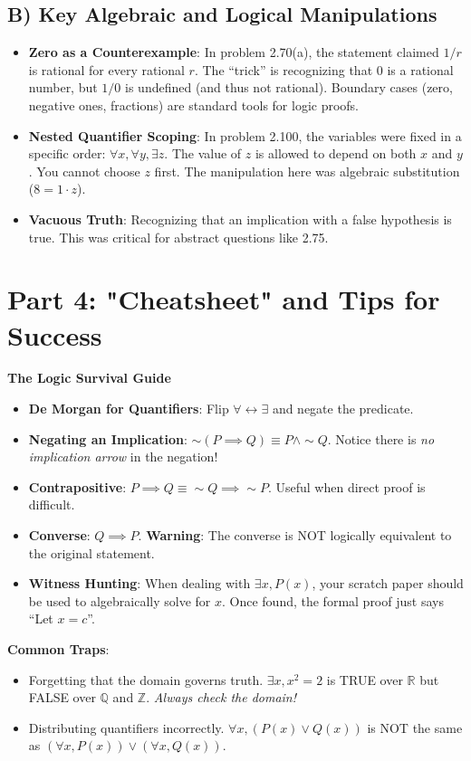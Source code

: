 \documentclass[12pt]{article}
\begin{document}
\subsection{B) Key Algebraic and Logical Manipulations}
\begin{itemize}
    \item \textbf{Zero as a Counterexample}: In problem 2.70(a), the statement claimed $1/r$ is rational for every rational $r$. The ``trick'' is recognizing that $0$ is a rational number, but $1/0$ is undefined (and thus not rational). Boundary cases (zero, negative ones, fractions) are standard tools for logic proofs.
    \item \textbf{Nested Quantifier Scoping}: In problem 2.100, the variables were fixed in a specific order: $\forall x, \forall y, \exists z$. The value of $z$ is allowed to depend on both $x$ and $y$. You cannot choose $z$ first. The manipulation here was algebraic substitution ($8 = 1 \cdot z$).
    \item \textbf{Vacuous Truth}: Recognizing that an implication with a false hypothesis is true. This was critical for abstract questions like 2.75.
\end{itemize}

\section{Part 4: "Cheatsheet" and Tips for Success}

\begin{mdframed}[backgroundcolor=gray!10]
\textbf{The Logic Survival Guide}
\begin{itemize}
    \item \textbf{De Morgan for Quantifiers}: Flip $\forall \leftrightarrow \exists$ and negate the predicate.
    \item \textbf{Negating an Implication}: $\sim(P \implies Q) \equiv P \land \sim Q$. Notice there is \textit{no implication arrow} in the negation!
    \item \textbf{Contrapositive}: $P \implies Q \equiv \sim Q \implies \sim P$. Useful when direct proof is difficult.
    \item \textbf{Converse}: $Q \implies P$. \textbf{Warning}: The converse is NOT logically equivalent to the original statement.
    \item \textbf{Witness Hunting}: When dealing with $\exists x, P(x)$, your scratch paper should be used to algebraically solve for $x$. Once found, the formal proof just says ``Let $x = c$''.
\end{itemize}
\textbf{Common Traps}:
\begin{itemize}
    \item Forgetting that the domain governs truth. $\exists x, x^2=2$ is TRUE over $\mathbb{R}$ but FALSE over $\mathbb{Q}$ and $\mathbb{Z}$. \textit{Always check the domain!}
    \item Distributing quantifiers incorrectly. $\forall x, (P(x) \lor Q(x))$ is NOT the same as $(\forall x, P(x)) \lor (\forall x, Q(x))$.
\end{itemize}
\end{mdframed}
\end{document}
